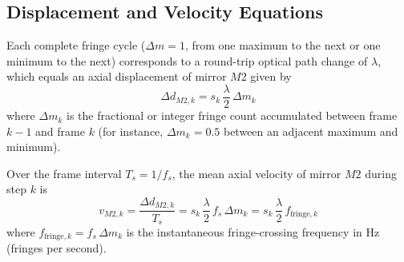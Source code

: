 \subsection{Displacement and Velocity Equations}
Each complete fringe cycle ($\Delta m = 1$, from one maximum to the next or one minimum to the next) corresponds to a round-trip optical path change of $\lambda$, which equals an axial displacement of mirror $M2$ given by
\begin{equation}
    \Delta d_{M2, k} = s_k\,\frac{\lambda}{2}\,\Delta m_k
    \label{eq:roi_step_displacement}
\end{equation}
where $\Delta m_k$ is the fractional or integer fringe count accumulated between frame $k-1$ and frame $k$ (for instance, $\Delta m_k = 0.5$ between an adjacent maximum and minimum).

Over the frame interval $T_s = 1/f_s$, the mean axial velocity of mirror $M2$ during step $k$ is
\begin{equation}
    v_{M2, k} = \frac{\Delta d_{M2, k}}{T_s} = s_k\,\frac{\lambda}{2}\,f_s\,\Delta m_k = s_k\,\frac{\lambda}{2}\,f_{\text{fringe}, k}
    \label{eq:roi_step_velocity}
\end{equation}
where $f_{\text{fringe}, k} = f_s\,\Delta m_k$ is the instantaneous fringe-crossing frequency in $\text{Hz}$ (fringes per second).


